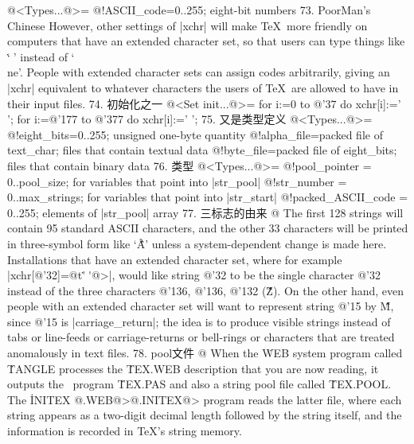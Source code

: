     @<Types...@>=
    @!ASCII_code=0..255; {eight-bit numbers}
73. PoorMan's Chinese
    However, other settings of |xchr| will make \TeX\ more friendly on
    computers that have an extended character set, so that users can type things
    like `\.^^Z' instead of `\.{\\ne}'. People with extended character sets can
    assign codes arbitrarily, giving an |xchr| equivalent to whatever
    characters the users of \TeX\ are allowed to have in their input files.
74. 初始化之一
    @<Set init...@>=
    for i:=0 to @'37 do xchr[i]:=' ';
    for i:=@'177 to @'377 do xchr[i]:=' ';
75. 又是类型定义
    @<Types...@>=
    @!eight_bits=0..255; {unsigned one-byte quantity}
    @!alpha_file=packed file of text_char; {files that contain textual data}
    @!byte_file=packed file of eight_bits; {files that contain binary data}
76. 类型
    @<Types...@>=
    @!pool_pointer = 0..pool_size; {for variables that point into |str_pool|}
    @!str_number = 0..max_strings; {for variables that point into |str_start|}
    @!packed_ASCII_code = 0..255; {elements of |str_pool| array}
77. 三标志的由来
    @ The first 128 strings will contain 95 standard ASCII characters, and the
    other 33 characters will be printed in three-symbol form like `\.{\^\^A}'
    unless a system-dependent change is made here. Installations that have
    an extended character set, where for example |xchr[@'32]=@t\.{\'^^Z\'}@>|,
    would like string @'32 to be the single character @'32 instead of the
    three characters @'136, @'136, @'132 (\.{\^\^Z}). On the other hand,
    even people with an extended character set will want to represent string
    @'15 by \.{\^\^M}, since @'15 is |carriage_return|; the idea is to
    produce visible strings instead of tabs or line-feeds or carriage-returns
    or bell-rings or characters that are treated anomalously in text files.
78. pool文件
    @ When the \.{WEB} system program called \.{TANGLE} processes the \.{TEX.WEB}
    description that you are now reading, it outputs the \PASCAL\ program
    \.{TEX.PAS} and also a string pool file called \.{TEX.POOL}. The \.{INITEX}
    @.WEB@>@.INITEX@>
    program reads the latter file, where each string appears as a two-digit decimal
    length followed by the string itself, and the information is recorded in
    \TeX's string memory.
    
